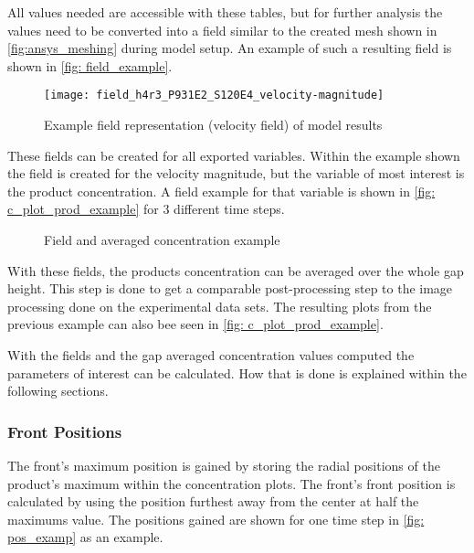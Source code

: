 \documentclass[../thesis.tex]{subfiles}
\begin{document}
All values needed are accessible with these tables, but for further analysis the values need to be converted into a field similar to the created mesh shown in \autoref{fig:ansys_meshing} during model setup. An example of such a resulting field is shown in \autoref{fig: field_example}.
\begin{figure}[htbp]
	\centering
	\texttt{[image: field\_h4r3\_P931E2\_S120E4\_velocity-magnitude]}
	\caption{Example field representation (velocity field) of model results}
	\label{fig: field_example}
\end{figure}
These fields can be created for all exported variables. Within the example shown the field is created for the velocity magnitude, but the variable of most interest is the product concentration. A field example for that variable is shown in \autoref{fig: c_plot_prod_example} for 3 different time steps.
\begin{figure}[htb]
	\centering
	\qquad
	\caption{Field and averaged concentration example}%
	\label{fig: c_plot_prod_example}%
\end{figure}
With these fields, the products concentration can be averaged over the whole gap height. This step is done to get a comparable post-processing step to the image processing done on the experimental data sets. The resulting plots from the previous example can also bee seen in \autoref{fig: c_plot_prod_example}.

With the fields and the gap averaged concentration values computed the parameters of interest can be calculated. How that is done is explained within the following sections.

\subsubsection{Front Positions}

The front's maximum position is gained by storing the radial positions of the product's maximum within the concentration plots. The front's front position is calculated by using the position furthest away from the center at half the maximums value. The positions gained are shown for one time step in \autoref{fig: pos_examp} as an example.
\end{document}
